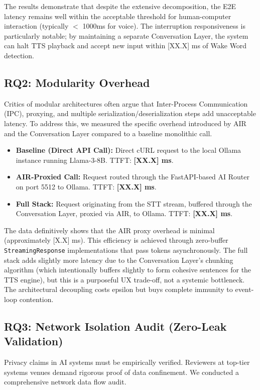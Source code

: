 \documentclass[conference]{IEEEtran}
\begin{document}
The results demonstrate that despite the extensive decomposition, the E2E latency remains well within the acceptable threshold for human-computer interaction (typically $<$ 1000ms for voice). The interruption responsiveness is particularly notable; by maintaining a separate Conversation Layer, the system can halt TTS playback and accept new input within [XX.X] ms of Wake Word detection.

\subsection{RQ2: Modularity Overhead}
Critics of modular architectures often argue that Inter-Process Communication (IPC), proxying, and multiple serialization/deserialization steps add unacceptable latency. To address this, we measured the specific overhead introduced by AIR and the Conversation Layer compared to a baseline monolithic call.

\begin{itemize}
    \item \textbf{Baseline (Direct API Call):} Direct cURL request to the local Ollama instance running Llama-3-8B. TTFT: \textbf{[XX.X] ms}.
    \item \textbf{AIR-Proxied Call:} Request routed through the FastAPI-based AI Router on port 5512 to Ollama. TTFT: \textbf{[XX.X] ms}.
    \item \textbf{Full Stack:} Request originating from the STT stream, buffered through the Conversation Layer, proxied via AIR, to Ollama. TTFT: \textbf{[XX.X] ms}.
\end{itemize}

The data definitively shows that the AIR proxy overhead is minimal (approximately [X.X] ms). This efficiency is achieved through zero-buffer \texttt{StreamingResponse} implementations that pass tokens asynchronously. The full stack adds slightly more latency due to the Conversation Layer's chunking algorithm (which intentionally buffers slightly to form cohesive sentences for the TTS engine), but this is a purposeful UX trade-off, not a systemic bottleneck. The architectural decoupling costs epsilon but buys complete immunity to event-loop contention.

\subsection{RQ3: Network Isolation Audit (Zero-Leak Validation)}
Privacy claims in AI systems must be empirically verified. Reviewers at top-tier systems venues demand rigorous proof of data confinement. We conducted a comprehensive network data flow audit.
\end{document}
